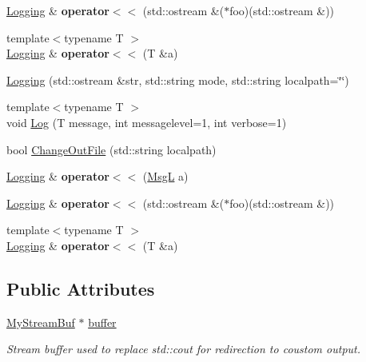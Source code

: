 \begin{DoxyCompactItemize}
\item 
\hypertarget{classLogging_adcbbc7dc2221a2f5fb88dc68089fb91c}{\hyperlink{classLogging}{Logging} \& {\bfseries operator$<$$<$} (std\-::ostream \&($\ast$foo)(std\-::ostream \&))}\label{classLogging_adcbbc7dc2221a2f5fb88dc68089fb91c}

\item 
\hypertarget{classLogging_a4e1557aba6b12232714eead91264587e}{{\footnotesize template$<$typename T $>$ }\\\hyperlink{classLogging}{Logging} \& {\bfseries operator$<$$<$} (T \&a)}\label{classLogging_a4e1557aba6b12232714eead91264587e}

\item 
\hyperlink{classLogging_acdc54e0c7b62f8542ab9508b1df77aa0}{Logging} (std\-::ostream \&str, std\-::string mode, std\-::string localpath=\char`\"{}\char`\"{})
\item 
{\footnotesize template$<$typename T $>$ }\\void \hyperlink{classLogging_af7839ee68729b066da269cc012b1fcc9}{Log} (T message, int messagelevel=1, int verbose=1)
\item 
bool \hyperlink{classLogging_a7a0c89c152ad81fb41a849ed9d81e429}{Change\-Out\-File} (std\-::string localpath)
\item 
\hypertarget{classLogging_aed3d056a85b2bee70f31752595397a60}{\hyperlink{classLogging}{Logging} \& {\bfseries operator$<$$<$} (\hyperlink{structMsgL}{Msg\-L} a)}\label{classLogging_aed3d056a85b2bee70f31752595397a60}

\item 
\hypertarget{classLogging_adcbbc7dc2221a2f5fb88dc68089fb91c}{\hyperlink{classLogging}{Logging} \& {\bfseries operator$<$$<$} (std\-::ostream \&($\ast$foo)(std\-::ostream \&))}\label{classLogging_adcbbc7dc2221a2f5fb88dc68089fb91c}

\item 
\hypertarget{classLogging_a4e1557aba6b12232714eead91264587e}{{\footnotesize template$<$typename T $>$ }\\\hyperlink{classLogging}{Logging} \& {\bfseries operator$<$$<$} (T \&a)}\label{classLogging_a4e1557aba6b12232714eead91264587e}

\end{DoxyCompactItemize}
\subsection*{Public Attributes}
\begin{DoxyCompactItemize}
\item 
\hypertarget{classLogging_a0fe24ccb3e56851bb763031243819107}{\hyperlink{classLogging_1_1MyStreamBuf}{My\-Stream\-Buf} $\ast$ \hyperlink{classLogging_a0fe24ccb3e56851bb763031243819107}{buffer}}\label{classLogging_a0fe24ccb3e56851bb763031243819107}

\begin{DoxyCompactList}\small\item\em Stream buffer used to replace std\-::cout for redirection to coustom output. \end{DoxyCompactList}\end{DoxyCompactItemize}


